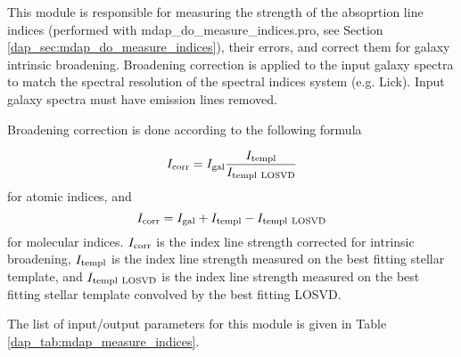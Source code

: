 \documentclass[11pt]{book}
\begin{document}
This module is responsible for measuring the strength of the
absoprtion line indices (performed with
mdap\_do\_measure\_indices.pro, see Section
\ref{dap_sec:mdap_do_measure_indices}), their errors, and correct them for galaxy
intrinsic broadening. Broadening correction is applied to the input
galaxy spectra to match the spectral resolution of the spectral
indices system (e.g. Lick). Input galaxy spectra must have emission
lines removed.

Broadening correction is done according to the following formula

\[
I_{\rm corr} = I_{\rm gal} \frac{I_{\rm templ}}{I_{\rm templ\ LOSVD}}
\]
for atomic indices, and 
\[
I_{\rm corr} = I_{\rm gal} + I_{\rm templ} - I_{\rm templ\ LOSVD}
\]
for molecular indices.  $I_{\rm corr}$ is the index line strength
corrected for intrinsic broadening, $I_{\rm templ}$ is the index line
strength measured on the best fitting stellar template, and $I_{\rm templ\
  LOSVD}$ is the index line strength measured on the best fitting
stellar template convolved by the best fitting LOSVD.

The list of input/output parameters for this module is given in Table
\ref{dap_tab:mdap_measure_indices}.
\end{document}
